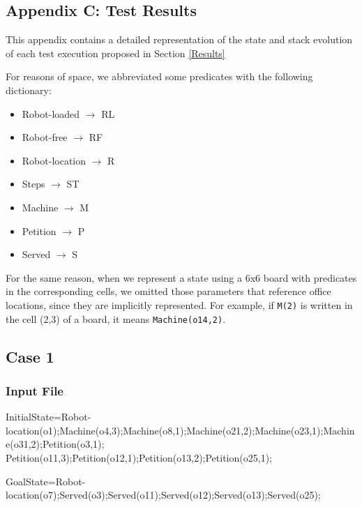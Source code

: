 \documentclass[12pt,a4paper,oneside]{article}
\numberwithin{equation}{section}
\numberwithin{equation}{section}
\theoremstyle{definition}
\begin{document}
\begin{itemize}
\newpage

\section*{Appendix C: Test Results} \label{Test Results}


This appendix contains a detailed representation of the state and stack evolution of each test execution proposed in Section \ref{Results}


For reasons of space, we abbreviated some predicates with the following dictionary:
\begin{itemize}
	\item Robot-loaded $\rightarrow$ RL
	\item Robot-free $\rightarrow$ RF
	\item Robot-location $\rightarrow$ R
	\item Steps $\rightarrow$ ST
	\item Machine $\rightarrow$ M
	\item Petition $\rightarrow$ P
	\item Served $\rightarrow$ S
\end{itemize}

For the same reason, when we represent a state using a 6x6 board with predicates in the corresponding cells, we omitted those parameters that reference office locations, since they are implicitly represented. For example, if \texttt{M(2)} is written in the cell (2,3) of a board, it means \texttt{Machine(o14,2)}.


\subsection*{Case 1}

\subsubsection*{Input File}

\begin{listing}[style=consola, numbers=none]
InitialState=Robot-location(o1);Machine(o4,3);Machine(o8,1);Machine(o21,2);Machine(o23,1);Machine(o31,2);Petition(o3,1); Petition(o11,3);Petition(o12,1);Petition(o13,2);Petition(o25,1);

GoalState=Robot-location(o7);Served(o3);Served(o11);Served(o12);Served(o13);Served(o25);
\end{listing}


\end{itemize}
\end{document}
